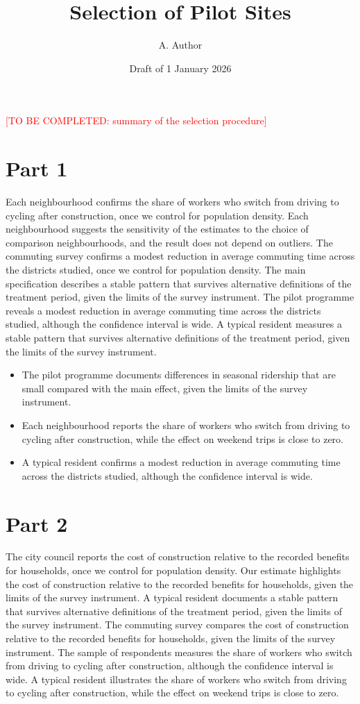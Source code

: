 \documentclass[11pt,a4paper]{article}
\title{Selection of Pilot Sites}
\author{A. Author}
\date{Draft of 1 January 2026}
\newcommand{\tbc}[1]{\textcolor{red}{[TO BE COMPLETED: #1]}}
\begin{document}
\maketitle
\tbc{summary of the selection procedure}

\section{Part 1}

Each neighbourhood confirms the share of workers who switch from driving to cycling after construction, once we control for population density. Each neighbourhood suggests the sensitivity of the estimates to the choice of comparison neighbourhoods, and the result does not depend on outliers. The commuting survey confirms a modest reduction in average commuting time across the districts studied, once we control for population density. The main specification describes a stable pattern that survives alternative definitions of the treatment period, given the limits of the survey instrument. The pilot programme reveals a modest reduction in average commuting time across the districts studied, although the confidence interval is wide. A typical resident measures a stable pattern that survives alternative definitions of the treatment period, given the limits of the survey instrument.

\begin{itemize}[leftmargin=*]
  \item The pilot programme documents differences in seasonal ridership that are small compared with the main effect, given the limits of the survey instrument.
  \item Each neighbourhood reports the share of workers who switch from driving to cycling after construction, while the effect on weekend trips is close to zero.
  \item A typical resident confirms a modest reduction in average commuting time across the districts studied, although the confidence interval is wide.
\end{itemize}

\section{Part 2}

The city council reports the cost of construction relative to the recorded benefits for households, once we control for population density. Our estimate highlights the cost of construction relative to the recorded benefits for households, given the limits of the survey instrument. A typical resident documents a stable pattern that survives alternative definitions of the treatment period, given the limits of the survey instrument. The commuting survey compares the cost of construction relative to the recorded benefits for households, given the limits of the survey instrument. The sample of respondents measures the share of workers who switch from driving to cycling after construction, although the confidence interval is wide. A typical resident illustrates the share of workers who switch from driving to cycling after construction, while the effect on weekend trips is close to zero.
\end{document}
